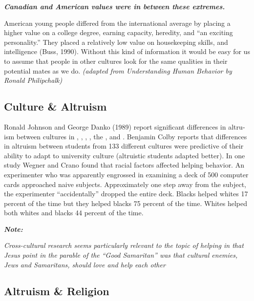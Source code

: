 \documentclass[
]{book}
\begin{document}
\begin{caution}
\textbf{\emph{Canadian and American values were in between these extremes.}}
\end{caution}

American young people differed from the international average by placing a higher value on a college degree, earning capacity, heredity, and ``an exciting personality.'' They placed a relatively low value on housekeeping skills, and intelligence (Buss, 1990). Without this kind of information it would be easy for us to assume that people in other cultures look for the same qualities in their potential mates as we do. \emph{(adapted from Understanding Human Behavior by Ronald Philipchalk)}

\hypertarget{culture-altruism}{%
\subsection*{Culture \& Altruism}\label{culture-altruism}}

Ronald Johnson and George Danko (1989) report significant differences in altru­ism between cultures in , , , , the , and . Benjamin Colby reports that differences in altruism between stu­dents from 133 different cultures were predictive of their ability to adapt to university culture (altruistic students adapted better). In one study Wegner and Crano found that racial fac­tors affected helping behavior. An exper­i­menter who was apparently engrossed in examining a deck of 500 computer cards approached naive subjects. Approximately one step away from the subject, the experimenter ``accidentally'' dropped the entire deck. Blacks helped whites 17 percent of the time but they helped blacks 75 percent of the time. Whites helped both whites and blacks 44 percent of the time.

\begin{caution}
\textbf{\emph{Note:}}

\emph{Cross-cultural research seems particularly relevant to the topic of helping in that Jesus point in the parable of the ``Good Samaritan'' was that cultural enemies, Jews and Samaritans, should love and help each other}
\end{caution}

\hypertarget{altruism-religion}{%
\subsection*{Altruism \& Religion}\label{altruism-religion}}
\end{document}
